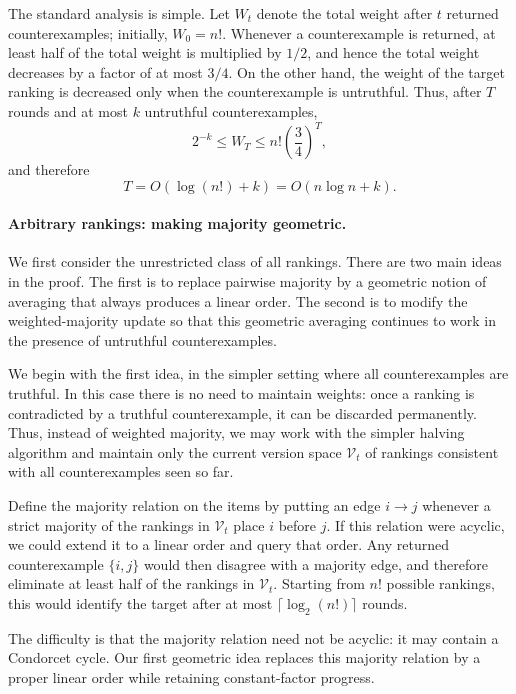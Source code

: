 \documentclass[11pt]{article}
\theoremstyle{definition}
\theoremstyle{remark}
\begin{document}
The standard analysis is simple.
Let $W_t$ denote the total weight after $t$ returned counterexamples;
initially, $W_0=n!$. Whenever a counterexample is
returned, at least half of the total weight is multiplied by $1/2$, and hence
the total weight decreases by a factor of at most $3/4$. On the other hand,
the weight of the target ranking is decreased only when the counterexample is
untruthful. Thus, after $T$ rounds and at most $k$ untruthful
counterexamples,
\[
    2^{-k}
    \leq W_T
    \leq n!\left(\frac34\right)^T,
\]
and therefore
\[
    T=O(\log(n!)+k)=O(n\log n+k).
\]

\paragraph{Arbitrary rankings: making majority geometric.}
We first consider the unrestricted class of all rankings. There are two main
ideas in the proof. The first is to replace pairwise majority by a geometric
notion of averaging that always produces a linear order. The second is to
modify the weighted-majority update so that this geometric averaging continues
to work in the presence of untruthful counterexamples. 

We begin with the first idea, in the simpler setting where all
counterexamples are truthful. In this case there is no need to maintain
weights: once a ranking is contradicted by a truthful counterexample, it can
be discarded permanently. Thus, instead of weighted majority, we may work
with the simpler halving algorithm and maintain only the current version
space $\mathcal V_t$ of rankings consistent with all counterexamples seen so
far.

Define the majority relation on the items by putting an edge $i\to j$
whenever a strict majority of the rankings in $\mathcal V_t$ place $i$
before $j$. If this relation were acyclic, we could extend it to a linear
order and query that order. Any returned counterexample $\{i,j\}$ would then
disagree with a majority edge, and therefore eliminate at least half of the
rankings in $\mathcal V_t$. Starting from $n!$ possible rankings, this would
identify the target after at most $\lceil \log_2(n!)\rceil$ rounds.

The difficulty is that the majority relation need not be acyclic: it may
contain a Condorcet cycle. Our first geometric idea replaces this majority
relation by a proper linear order while retaining constant-factor progress.
\end{document}
